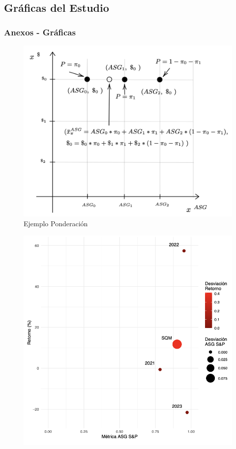 \documentclass{beamer}
\begin{document}
\subsection{Gráficas del Estudio}

\begin{frame}
    \frametitle{Anexos - Gráficas}

    \begin{minipage}{0.52\textwidth}
    \begin{figure}
        \centering
        \includegraphics[width=\textwidth]{EjemploActivoJ.png}
        \caption{Ejemplo Ponderación}
    \end{figure}
    \end{minipage}
    \hfill
    \begin{minipage}{0.45\textwidth}
    \begin{figure}
        \centering
        \includegraphics[width=\textwidth]{EjemploPonderacionSQM.png}

\end{figure}
\end{minipage}
\end{frame}
\end{document}
